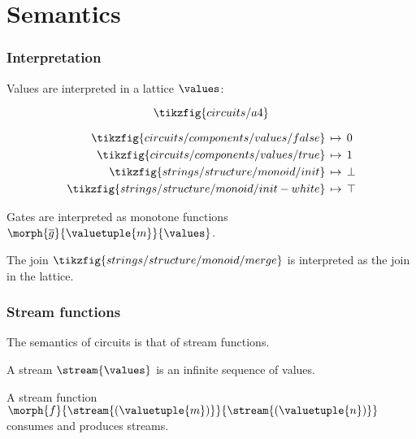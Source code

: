 \section{Semantics}

\begin{frame}
    \frametitle{Interpretation}

    Values are interpreted in a \alert{lattice} \(\values\):

    \begin{minipage}{0.49\textwidth}
        \[
            \tikzfig{circuits/a4}
        \]
    \end{minipage}
    \begin{minipage}{0.49\textwidth}
        \begin{align*}
            \tikzfig{circuits/components/values/false} 
            \,&\mapsto\, 0 \\
            \tikzfig{circuits/components/values/true} 
            \,&\mapsto\, 1 \\
            \tikzfig{strings/structure/monoid/init} 
            \,&\mapsto\, \bot \\
            \tikzfig{strings/structure/monoid/init-white} 
            \,&\mapsto\, \top \\
        \end{align*}
    \end{minipage}

    \pause

    Gates are interpreted as \alert{monotone functions} \(\morph{\overline{g}}{\valuetuple{m}}{\values}\).

    \pause

    The join \(\tikzfig{strings/structure/monoid/merge}\) is interpreted as the \alert{join in the lattice}.
\end{frame}

\begin{frame}
    \frametitle{Stream functions}

    The semantics of circuits is that of \alert{stream functions}.

    \pause

    A \alert{stream} \(\stream{\values}\) is an infinite sequence of values.
    
    \pause
    
    A \alert{stream function} \(\morph{f}{\stream{(\valuetuple{m})}}{\stream{(\valuetuple{n})}}\) consumes and produces streams.

\end{frame}

